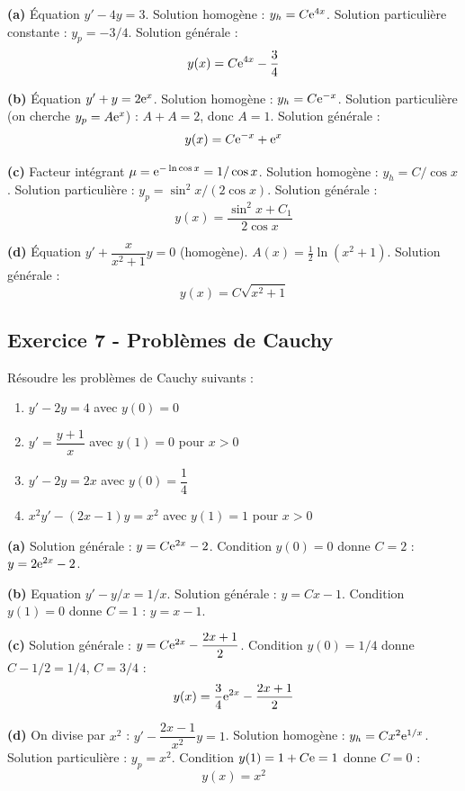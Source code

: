 \documentclass[12pt,a4paper]{article}
\begin{document}
\begin{boitecorrige}
\textbf{(a)} Équation $y' - 4y = 3$. Solution homogène : $y_h = C\mathrm{e}^{4x}$. Solution particulière constante : $y_p = -3/4$. Solution générale :
\[
y(x) = C\mathrm{e}^{4x} - \frac{3}{4}
\]

\textbf{(b)} Équation $y' + y = 2\mathrm{e}^x$. Solution homogène : $y_h = C\mathrm{e}^{-x}$. Solution particulière (on cherche $y_p = A\mathrm{e}^x$) : $A + A = 2$, donc $A = 1$. Solution générale :
\[
y(x) = C\mathrm{e}^{-x} + \mathrm{e}^x
\]

\textbf{(c)} Facteur intégrant $\mu = \mathrm{e}^{-\ln\cos x} = 1/\cos x$. Solution homogène : $y_h = C/\cos x$. Solution particulière : $y_p = \sin^2 x/(2\cos x)$. Solution générale :
\[
y(x) = \frac{\sin^2 x + C_1}{2\cos x}
\]

\textbf{(d)} Équation $y' + \dfrac{x}{x^2+1}y = 0$ (homogène). $A(x) = \frac{1}{2}\ln(x^2+1)$. Solution générale :
\[
y(x) = C\sqrt{x^2+1}
\]
\end{boitecorrige}

\subsection*{Exercice 7 - Problèmes de Cauchy \niveau{\moyen}}

\begin{boiteexercice}
Résoudre les problèmes de Cauchy suivants :
\begin{enumerate}[label=(\alph*)]
  \item $y' - 2y = 4$ avec $y(0) = 0$
  \item $y' = \dfrac{y+1}{x}$ avec $y(1) = 0$ pour $x > 0$
  \item $y' - 2y = 2x$ avec $y(0) = \dfrac{1}{4}$
  \item $x^2 y' - (2x-1)y = x^2$ avec $y(1) = 1$ pour $x > 0$
\end{enumerate}
\end{boiteexercice}

\begin{boitecorrige}
\textbf{(a)} Solution générale : $y = C\mathrm{e}^{2x} - 2$. Condition $y(0) = 0$ donne $C = 2$ : $y = 2\mathrm{e}^{2x} - 2$.

\textbf{(b)} Equation $y' - y/x = 1/x$. Solution générale : $y = Cx - 1$. Condition $y(1) = 0$ donne $C = 1$ : $y = x - 1$.

\textbf{(c)} Solution générale : $y = C\mathrm{e}^{2x} - \dfrac{2x+1}{2}$. Condition $y(0) = 1/4$ donne $C - 1/2 = 1/4$, $C = 3/4$ :
\[
y(x) = \frac{3}{4}\mathrm{e}^{2x} - \frac{2x+1}{2}
\]

\textbf{(d)} On divise par $x^2$ : $y' - \dfrac{2x-1}{x^2}y = 1$. Solution homogène : $y_h = Cx^2\mathrm{e}^{1/x}$. Solution particulière : $y_p = x^2$. Condition $y(1) = 1 + C\mathrm{e} = 1$ donne $C = 0$ :
\[
\boxed{y(x) = x^2}
\]
\end{boitecorrige}
\end{document}
